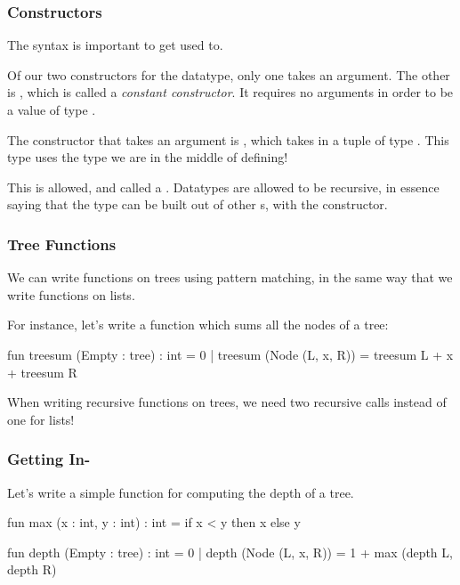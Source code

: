 \documentclass[aspectratio=169]{beamer}
\begin{document}
\begin{frame}[fragile]
  \frametitle{Constructors}

  The syntax is important to get used to.

  \vspace{\fill}

  Of our two constructors for the  datatype, only one takes an argument. The other is
  , which is called a \textit{constant constructor}. It requires no arguments in order
  to be a value of type .

  \vspace{\fill}

  The constructor that takes an argument is , which takes in a tuple of type
  . This type uses the  type we are in the middle of defining!

  \vspace{\fill}

  This is allowed, and called a . Datatypes are allowed to be recursive,
  in essence saying that the  type can be built out of other s, with the
   constructor.
\end{frame}

\begin{frame}[fragile]
  \frametitle{Tree Functions}

  We can write functions on trees using pattern matching, in the same way that we
  write functions on lists.

  For instance, let's write a function which sums all the nodes of a tree:

  \begin{codeblock}
    fun treesum (Empty : tree) : int = 0
      | treesum (Node (L, x, R)) = treesum L + x + treesum R
  \end{codeblock}

  When writing recursive functions on trees, we need two recursive calls instead of one
  for lists!
\end{frame}

\begin{frame}[fragile]
  \frametitle{Getting In-}

  Let's write a simple function for computing the depth of a tree.

  \vspace{\fill}

  \begin{codeblock}
    fun max (x : int, y : int) : int =
      if x < y then x else y

    fun depth (Empty : tree) : int = 0
      | depth (Node (L, x, R)) = 1 + max (depth L, depth R) 
  \end{codeblock}

\end{frame}
\end{document}
